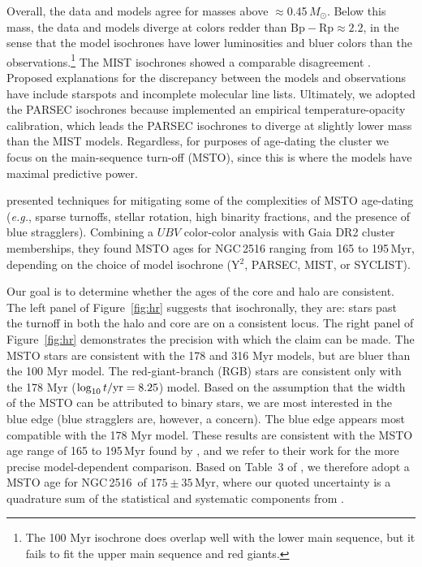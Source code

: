 \documentclass[12pt,twocolumn,tighten]{aastex63}
\newcommand{\cn}{NGC\,2516} %
\begin{document}
Overall, the data and models agree for masses above
$\approx$0.45\,$M_\odot$.  Below this mass, the data and models
diverge at colors redder than $\mathrm{Bp}-\mathrm{Rp}\approx2.2$, in
the sense that the model isochrones have lower luminosities and bluer
colors than the observations.\footnote{The 100 Myr isochrone does
overlap well with the lower main sequence, but it fails to fit the
upper main sequence and red giants.}  The MIST isochrones showed a
comparable disagreement \citep{choi_mesa_2016}.  Proposed explanations
for the discrepancy between the models and observations have include
starspots and incomplete molecular line lists\citep[{\it
e.g.},][]{stauffer_why_2003,feiden_magnetic_2013,rajpurohit_effective_2013,mann_spectrothermometry_2013,choi_mesa_2016}.
Ultimately, we adopted the PARSEC isochrones because
\citet{chen_improving_2014} implemented an empirical
temperature-opacity calibration, which leads the PARSEC isochrones to
diverge at slightly lower mass than the MIST models.  Regardless, for
purposes of age-dating the cluster we focus on the main-sequence
turn-off (MSTO), since this is where the models have maximal
predictive power.

\citet{cummings_2018} presented techniques for mitigating some of the
complexities of MSTO age-dating ({\it e.g.}, sparse turnoffs, stellar
rotation, high binarity fractions, and the presence of blue
stragglers).  Combining a $UBV$ color-color analysis with Gaia DR2
cluster memberships, they found MSTO ages for NGC\,2516 ranging from
165 to 195\,Myr, depending on the choice of model isochrone (Y$^2$,
PARSEC, MIST, or SYCLIST).

Our goal is to determine whether the ages of the core and halo are
consistent.  The left panel of Figure~\ref{fig:hr} suggests that
isochronally, they are: stars past the turnoff in both the halo and
core are on a consistent locus.  The right panel of
Figure~\ref{fig:hr} demonstrates the precision with which the claim
can be made.  The MSTO stars are consistent with the 178 and 316 Myr
models, but are bluer than the 100 Myr model.  The red-giant-branch
(RGB) stars are consistent only with the 178 Myr ($\log_{10} t/{\rm
yr} = 8.25$) model.  Based on the assumption that the width of the
MSTO can be attributed to binary stars, we are most interested in the
blue edge (blue stragglers are, however, a concern).  The blue edge
appears most compatible with the 178 Myr model.  These results are
consistent with the MSTO age range of 165 to 195\,Myr found by
\citet{cummings_2018}, and we refer to their work for the more precise
model-dependent comparison.  Based on Table~3 of
\citet{cummings_2018}, we therefore adopt a MSTO age for \cn\ of
$175\pm35$\,Myr, where our quoted uncertainty is a quadrature sum of
the statistical and systematic components from \cite{cummings_2018}. 
\end{document}
